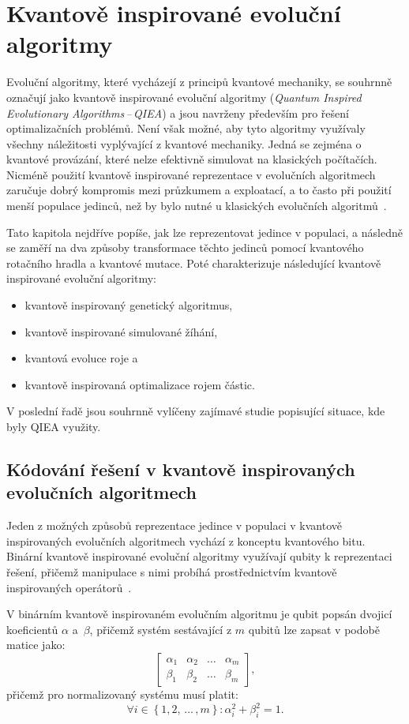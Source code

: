 \chapter{Kvantově inspirované evoluční algoritmy} \label{chapt:qiea}
Evoluční algoritmy, které vycházejí z principů kvantové mechaniky, se souhrnně označují jako kvantově inspirované evoluční algoritmy (\emph{Quantum Inspired Evolutionary Algorithms\,--\,QIEA}) a jsou navrženy především pro řešení optimalizačních problémů. 
Není však možné, aby tyto algoritmy využívaly všechny náležitosti vyplývající z kvantové mechaniky. 
Jedná se zejména o kvantové provázání, které nelze efektivně simulovat na klasických počítačích. 
Nicméně použití kvantově inspirované reprezentace v evolučních algoritmech zaručuje dobrý kompromis mezi průzkumem a exploatací, a to často při použití menší populace jedinců, než by bylo nutné u klasických evolučních algoritmů~\cite{NaturalComputing}.

Tato kapitola nejdříve popíše, jak lze reprezentovat jedince v populaci, a následně se zaměří na dva způsoby transformace těchto jedinců pomocí kvantového rotačního hradla a kvantové mutace. 
Poté charakterizuje následující kvantově inspirované evoluční algoritmy:
\begin{itemize}
    \item kvantově inspirovaný genetický algoritmus,
    \item kvantově inspirované simulované žíhání,
    \item kvantová evoluce roje a
    \item kvantově inspirovaná optimalizace rojem částic.
\end{itemize}
V poslední řadě jsou souhrnně vylíčeny zajímavé studie popisující situace, kde byly QIEA využity. 

\section{Kódování řešení v kvantově inspirovaných evolučních algoritmech}
Jeden z možných způsobů reprezentace jedince v populaci v kvantově inspirovaných evolučních algoritmech vychází z konceptu kvantového bitu. 
Binární kvantově inspirované evoluční algoritmy využívají qubity k reprezentaci řešení, přičemž manipulace s nimi probíhá prostřednictvím kvantově inspirovaných operátorů~\cite{NaturalComputing}. 

V binárním kvantově inspirovaném evolučním algoritmu je qubit popsán dvojicí koeficientů $\alpha$ a~$\beta$, přičemž systém sestávající z $m$ qubitů lze zapsat v podobě matice jako: 
\begin{equation}\label{eq:quantum-representation}
    \begin{bmatrix}
        \alpha_1 & \alpha_2 & \dots & \alpha_m \\
        \beta_1  & \beta_2  & \dots & \beta_m
    \end{bmatrix},
\end{equation}
přičemž pro normalizovaný systému musí platit:
\begin{equation}\label{eq:normalized-quantum-representation}
    \forall i \in \left\{1,2,\,\dots\,,m \right\}: \alpha^2_i + \beta^2_i = 1.
\end{equation}

